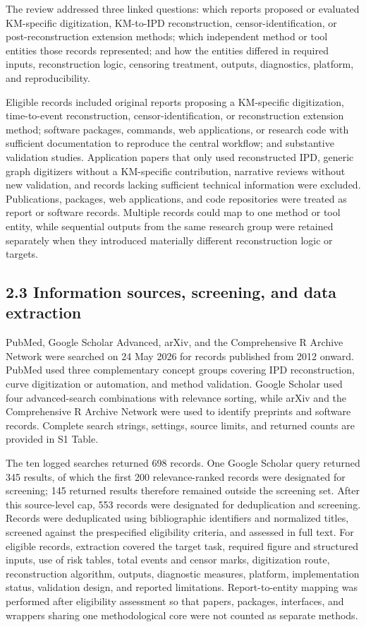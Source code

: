 \documentclass[
  english,
  letterpaper,
  DIV=11,
  numbers=noendperiod]{scrartcl}
\begin{document}
The review addressed three linked questions: which reports proposed or
evaluated KM-specific digitization, KM-to-IPD reconstruction,
censor-identification, or post-reconstruction extension methods; which
independent method or tool entities those records represented; and how
the entities differed in required inputs, reconstruction logic,
censoring treatment, outputs, diagnostics, platform, and
reproducibility.

Eligible records included original reports proposing a KM-specific
digitization, time-to-event reconstruction, censor-identification, or
reconstruction extension method; software packages, commands, web
applications, or research code with sufficient documentation to
reproduce the central workflow; and substantive validation studies.
Application papers that only used reconstructed IPD, generic graph
digitizers without a KM-specific contribution, narrative reviews without
new validation, and records lacking sufficient technical information
were excluded. Publications, packages, web applications, and code
repositories were treated as report or software records. Multiple
records could map to one method or tool entity, while sequential outputs
from the same research group were retained separately when they
introduced materially different reconstruction logic or targets.

\subsection{2.3 Information sources, screening, and data
extraction}\label{information-sources-screening-and-data-extraction}

PubMed, Google Scholar Advanced, arXiv, and the Comprehensive R Archive
Network were searched on 24 May 2026 for records published from 2012
onward. PubMed used three complementary concept groups covering IPD
reconstruction, curve digitization or automation, and method validation.
Google Scholar used four advanced-search combinations with relevance
sorting, while arXiv and the Comprehensive R Archive Network were used
to identify preprints and software records. Complete search strings,
settings, source limits, and returned counts are provided in S1 Table.

The ten logged searches returned 698 records. One Google Scholar query
returned 345 results, of which the first 200 relevance-ranked records
were designated for screening; 145 returned results therefore remained
outside the screening set. After this source-level cap, 553 records were
designated for deduplication and screening. Records were deduplicated
using bibliographic identifiers and normalized titles, screened against
the prespecified eligibility criteria, and assessed in full text. For
eligible records, extraction covered the target task, required figure
and structured inputs, use of risk tables, total events and censor
marks, digitization route, reconstruction algorithm, outputs, diagnostic
measures, platform, implementation status, validation design, and
reported limitations. Report-to-entity mapping was performed after
eligibility assessment so that papers, packages, interfaces, and
wrappers sharing one methodological core were not counted as separate
methods.
\end{document}
